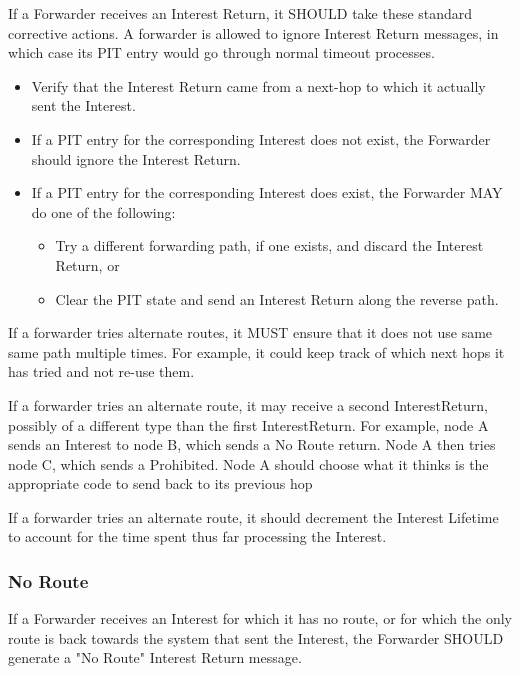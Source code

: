 \documentclass[12pt]{report}
\begin{document}
If a Forwarder receives an Interest Return, it SHOULD take these
standard corrective actions.  A forwarder is allowed to ignore
Interest Return messages, in which case its PIT entry would go
through normal timeout processes.

\begin{itemize}
\item  Verify that the Interest Return came from a next-hop to which it
   actually sent the Interest.

\item  If a PIT entry for the corresponding Interest does not exist, the
   Forwarder should ignore the Interest Return.

\item  If a PIT entry for the corresponding Interest does exist, the
   Forwarder MAY do one of the following:
\begin{itemize}
   \item  Try a different forwarding path, if one exists, and discard the
      Interest Return, or

   \item Clear the PIT state and send an Interest Return along the
      reverse path.
\end{itemize}
\end{itemize}

If a forwarder tries alternate routes, it MUST ensure that it does
not use same same path multiple times.  For example, it could keep
track of which next hops it has tried and not re-use them.

If a forwarder tries an alternate route, it may receive a second
InterestReturn, possibly of a different type than the first
InterestReturn.  For example, node A sends an Interest to node B,
which sends a No Route return.  Node A then tries node C, which sends
a Prohibited.  Node A should choose what it thinks is the appropriate
code to send back to its previous hop

If a forwarder tries an alternate route, it should decrement the
Interest Lifetime to account for the time spent thus far processing
the Interest.

\subsubsection{No Route}
If a Forwarder receives an Interest for which it has no route, or for
which the only route is back towards the system that sent the
Interest, the Forwarder SHOULD generate a "No Route" Interest Return
message.
\end{document}
